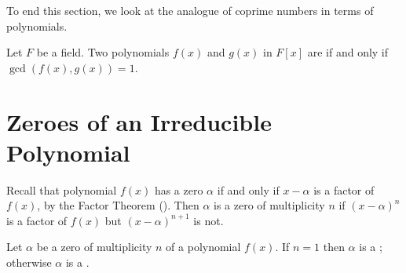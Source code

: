 To end this section, we look at the analogue of coprime numbers in terms of polynomials.

\begin{definition}
    Let $F$ be a field. Two polynomials $f(x)$ and $g(x)$ in $F[x]$ are  if and only if $\gcd(f(x), g(x)) = 1$.
\end{definition}

\section{Zeroes of an Irreducible Polynomial}
Recall that polynomial $f(x)$ has a zero $\alpha$ if and only if $x-\alpha$ is a factor of $f(x)$, by the Factor Theorem (). Then $\alpha$ is a zero of multiplicity $n$ if $(x-\alpha)^n$ is a factor of $f(x)$ but $(x-\alpha)^{n+1}$ is not.

\begin{definition}
    Let $\alpha$ be a zero of multiplicity $n$ of a polynomial $f(x)$. If $n = 1$ then $\alpha$ is a ; otherwise $\alpha$ is a .
\end{definition}


